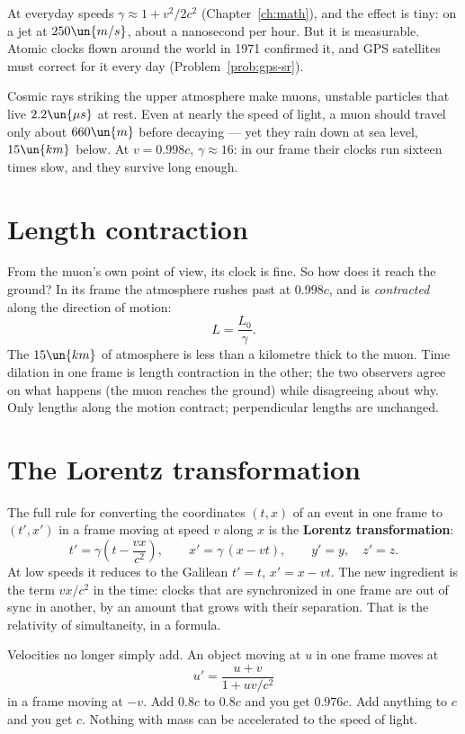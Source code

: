 At everyday speeds $\gamma\approx1+v^2/2c^2$ (Chapter~\ref{ch:math}), and the effect is tiny: on a jet at $250\un{m/s}$, about a nanosecond per hour. But it is measurable. Atomic clocks flown around the world in 1971 confirmed it, and GPS satellites must correct for it every day (Problem~\ref{prob:gps-sr}).

\begin{example}
Cosmic rays striking the upper atmosphere make muons, unstable particles that live $2.2\un{\mu s}$ at rest. Even at nearly the speed of light, a muon should travel only about $660\un{m}$ before decaying --- yet they rain down at sea level, $15\un{km}$ below. At $v = 0.998c$, $\gamma\approx16$: in our frame their clocks run sixteen times slow, and they survive long enough.
\end{example}

\section{Length contraction}

From the muon's own point of view, its clock is fine. So how does it reach the ground? In its frame the atmosphere rushes past at $0.998c$, and is \emph{contracted} along the direction of motion:
\[
  L = \frac{L_0}{\gamma}.
\]
The $15\un{km}$ of atmosphere is less than a kilometre thick to the muon. Time dilation in one frame is length contraction in the other; the two observers agree on what happens (the muon reaches the ground) while disagreeing about why. Only lengths along the motion contract; perpendicular lengths are unchanged.

\section{The Lorentz transformation}

The full rule for converting the coordinates $(t,x)$ of an event in one frame to $(t',x')$ in a frame moving at speed $v$ along $x$ is the \textbf{Lorentz transformation}:
\[
  t' = \gamma\left(t - \frac{vx}{c^2}\right), \qquad x' = \gamma\,(x - vt), \qquad y'=y,\quad z' = z .
\]
At low speeds it reduces to the Galilean $t'=t$, $x' = x - vt$. The new ingredient is the term $vx/c^2$ in the time: clocks that are synchronized in one frame are out of sync in another, by an amount that grows with their separation. That is the relativity of simultaneity, in a formula.

Velocities no longer simply add. An object moving at $u$ in one frame moves at
\[
  u' = \frac{u + v}{1 + uv/c^2}
\]
in a frame moving at $-v$. Add $0.8c$ to $0.8c$ and you get $0.976c$. Add anything to $c$ and you get $c$. Nothing with mass can be accelerated to the speed of light.

